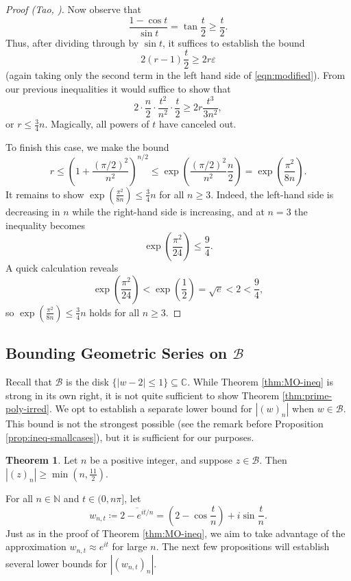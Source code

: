 \documentclass[11pt]{article}
\theoremstyle{definition}
\newtheorem{thm}{Theorem}
\newcommand{\C}{\mathbb C}
\newcommand{\calB}{\mathcal B}
\newcommand{\eps}{\varepsilon}
\begin{document}
\begin{proof}[Proof (Tao, \cite{tao-MO})]
	\par Now observe that
	\[
	\frac{1 - \cos t}{\sin t} = \tan \frac t2 \geq \frac t2.
	\]
	Thus, after dividing through by $\sin t$, it suffices to establish the bound
	\[
	2(r-1) \frac t2 \geq 2r\eps
	\]
	(again taking only the second term in the left hand side of \eqref{eqn:modified}).  From our previous inequalities it would suffice to show that
	\[
	2\cdot \frac n2 \cdot \frac{t^2}{n^2}\cdot \frac t2 \geq 2r\frac{t^3}{3n^2},
	\]
	or $r\leq \frac 34n$.  Magically, all powers of $t$ have canceled out.  
	
	\par To finish this case, we make the bound
	\[
	r\leq \left(1 + \frac{(\pi/2)^2}{n^2}\right)^{n/2} \leq \exp\left(\frac{(\pi/2)^2}{n^2}\frac n2\right) = \exp\left(\frac{\pi^2}{8n}\right).
	\]
	It remains to show $\exp(\tfrac{\pi^2}{8n})\leq \tfrac 34n$ for all $n\geq 3$.  Indeed, the left-hand side is decreasing in $n$ while the right-hand side is increasing, and at $n = 3$ the inequality becomes
	\[
	\exp\left(\frac{\pi^2}{24}\right) \leq \frac 94.
	\]
	A quick calculation reveals 
	\[
	\exp\left(\frac{\pi^2}{24}\right) < \exp\left(\frac12\right) = \sqrt{e} < 2 < \frac{9}{4},
	\]
	so $\exp(\tfrac{\pi^2}{8n}) \leq \tfrac 34n$ holds for all $n\geq 3$.
\end{proof}

\subsection{Bounding Geometric Series on $\calB$}

Recall that $\calB$ is the disk $\{|w-2| \leq 1\}\subseteq\C$.  While Theorem \ref{thm:MO-ineq} is strong in its own right, it is not quite sufficient to show
Theorem \ref{thm:prime-poly-irred}.  We opt to establish a separate lower bound for $|(w)_n|$
when $w\in\calB$.  This bound is not the strongest possible (see the remark before Proposition \ref{prop:ineq-smallcases}), but
it is sufficient for our purposes.

\begin{thm}\label{thm:min-geom-series}
	Let $n$ be a positive integer, and suppose $z\in\calB$.  Then $|(z)_n| \geq \min(n,\tfrac{11}2)$.
\end{thm}

For all $n\in\mathbb N$ and $t\in(0,n\pi]$, let 
\[
w_{n,t} \coloneqq \overline{2 - e^{it/n}} = \left(2-\cos\frac{ t}n\right) + i \sin\frac{t}n.
\]  
Just as in the proof of Theorem \ref{thm:MO-ineq}, we aim to take advantage of the approximation $w_{n,t}\approx e^{it}$ for large $n$.  The next few propositions will establish several lower bounds for $|(w_{n,t})_n|$.
\end{document}
